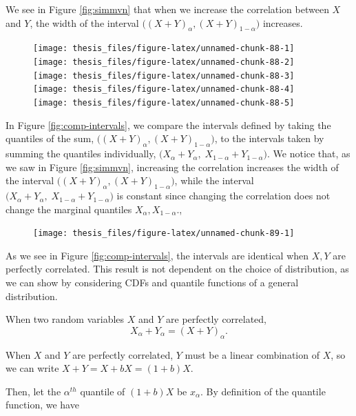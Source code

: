 \documentclass[12pt,twoside]{smiththesis}
\begin{document}
We see in Figure \ref{fig:simmvn} that when we increase the correlation between \(X\) and \(Y\), the width of the interval \(\Big((X+Y)_\alpha, (X+Y)_{1-\alpha}\Big)\) increases.
\begin{figure}

{\centering \texttt{[image: thesis\_files/figure-latex/unnamed-chunk-88-1]} \texttt{[image: thesis\_files/figure-latex/unnamed-chunk-88-2]} \texttt{[image: thesis\_files/figure-latex/unnamed-chunk-88-3]} \texttt{[image: thesis\_files/figure-latex/unnamed-chunk-88-4]} \texttt{[image: thesis\_files/figure-latex/unnamed-chunk-88-5]} 

}

\caption{\label{fig:simmvn}}\label{fig:unnamed-chunk-88}
\end{figure}
In Figure \ref{fig:comp-intervals}, we compare the intervals defined by taking the quantiles of the sum, \(\Big((X+Y)_\alpha, (X+Y)_{1-\alpha}\Big)\), to the intervals taken by summing the quantiles individually, \(\Big(X_\alpha +Y_\alpha, \; X_{1-\alpha} +Y_{1-\alpha}\Big)\). We notice that, as we saw in Figure \ref{fig:simmvn}, increasing the correlation increases the width of the interval \(\Big((X+Y)_\alpha, (X+Y)_{1-\alpha}\Big)\), while the interval \(\Big(X_\alpha +Y_\alpha, \; X_{1-\alpha} +Y_{1-\alpha}\Big)\) is constant since changing the correlation does not change the marginal quantiles \(X_\alpha, X_{1-\alpha}\).,
\begin{figure}

{\centering \texttt{[image: thesis\_files/figure-latex/unnamed-chunk-89-1]} 

}

\caption{\label{fig:comp-intervals}}\label{fig:unnamed-chunk-89}
\end{figure}
As we see in Figure \ref{fig:comp-intervals}, the intervals are identical when \(X,Y\) are perfectly correlated. This result is not dependent on the choice of distribution, as we can show by considering CDFs and quantile functions of a general distribution.
\begin{tcolorbox}[title = Quantiles of the Sum of Perfectly Correlated Random Variables]
When two random variables $X$ and $Y$ are perfectly correlated,
$$X_\alpha + Y_\alpha = (X+Y)_\alpha.$$
\end{tcolorbox}
When \(X\) and \(Y\) are perfectly correlated, \(Y\) must be a linear combination of \(X\), so we can write \(X+Y= X+bX=(1+b)X\).

Then, let the \(\alpha^{th}\) quantile of \((1+b)X\) be \(x_\alpha\). By definition of the quantile function, we have
\end{document}
